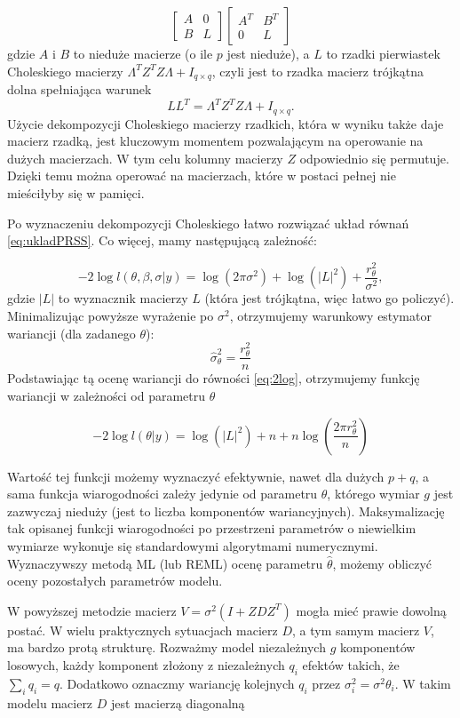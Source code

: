 \documentclass[12pt]{mwbk}
\theoremstyle{plain}
\theoremstyle{definition}
\theoremstyle{definition}
\begin{document}
$$\begin{bmatrix}
A & 0 \\
B & L
\end{bmatrix}
\begin{bmatrix}
A^T & B^T\\
0 & L
\end{bmatrix}
$$
gdzie $A$ i $B$ to nieduże macierze (o ile $p$ jest nieduże), a $L$ to rzadki pierwiastek Choleskiego macierzy $\Lambda^TZ^TZ\Lambda+I_{q\times q}$, czyli jest to rzadka macierz trójkątna dolna spełniająca warunek $$LL^T=\Lambda^TZ^TZ\Lambda +I_{q \times q}.$$ Użycie dekompozycji Choleskiego macierzy rzadkich, która w wyniku także daje macierz rzadką, jest kluczowym momentem pozwalającym na operowanie na dużych macierzach. W tym celu kolumny macierzy $Z$ odpowiednio się permutuje. Dzięki temu można operować na macierzach, które w postaci pełnej nie mieściłyby się w pamięci.

Po wyznaczeniu dekompozycji Choleskiego łatwo rozwiązać układ równań \ref{eq:ukladPRSS}. Co więcej, mamy następującą zależność:

\begin{equation} \label{eq:2log}
-2\log l(\theta,\beta,\sigma|y)=\log(2\pi \sigma^2)+\log(|L|^2) +\frac{r^2_{\theta}}{\sigma^2}, 
\end{equation}
gdzie $|L|$ to wyznacznik macierzy $L$ (która jest trójkątna, więc łatwo go policzyć). Minimalizując powyższe wyrażenie po $\sigma^2$, otrzymujemy warunkowy estymator wariancji (dla zadanego $\theta$):
$$\hat{\sigma}_{\theta}^2=\frac{r^2_{\theta}}{n}$$
Podstawiając tą ocenę wariancji do równości \ref{eq:2log}, otrzymujemy funkcję wariancji w zależności od parametru $\theta$

$$-2 \log l(\theta|y)=\log(|L|^2)+n+n\log\left(\frac{2\pi r^2_{\theta}}{n}\right)$$

Wartość tej funkcji możemy wyznaczyć efektywnie, nawet dla dużych $p+q$, a sama funkcja wiarogodności zależy jedynie od parametru $\theta$, którego wymiar $g$ jest zazwyczaj nieduży (jest to liczba komponentów wariancyjnych). Maksymalizację tak opisanej funkcji wiarogodności po przestrzeni parametrów o niewielkim wymiarze wykonuje się standardowymi algorytmami numerycznymi.
Wyznaczywszy metodą ML (lub REML) ocenę parametru $\hat{\theta}$, możemy obliczyć oceny pozostałych parametrów modelu. 

W powyższej metodzie macierz $V=\sigma^2(I+ZDZ^T)$ mogła mieć prawie dowolną postać. W wielu praktycznych sytuacjach macierz $D$, a tym samym macierz $V$, ma bardzo protą strukturę.
Rozważmy model niezależnych $g$ komponentów losowych, każdy komponent złożony z niezależnych $q_i$ efektów takich, że $\sum\limits_i q_i=q$. Dodatkowo oznaczmy wariancję kolejnych $q_i$ przez $\sigma^2_i=\sigma^2\theta_i$. W takim modelu macierz $D$ jest macierzą diagonalną
\end{document}

